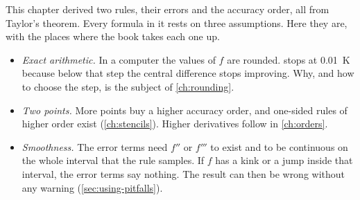 This chapter derived two rules, their errors and the accuracy order, all from Taylor's theorem. Every formula in it
rests on three assumptions. Here they are, with the places where the book takes each one up.
\begin{itemize}
  \item \emph{Exact arithmetic.} In a computer the values of $f$ are rounded.  stops at
    \SI{0.01}{\kelvin} because below that step the central difference stops improving. Why, and how to choose the
    step, is the subject of \cref{ch:rounding}.
  \item \emph{Two points.} More points buy a higher accuracy order, and one-sided rules of higher order exist
    (\cref{ch:stencils}). Higher derivatives follow in \cref{ch:orders}.
  \item \emph{Smoothness.} The error terms need $f''$ or $f'''$ to exist and to be continuous on the whole interval
    that the rule samples. If $f$ has a kink or a jump inside that interval, the error terms say nothing. The result
    can then be wrong without any warning (\cref{sec:using-pitfalls}).
\end{itemize}
